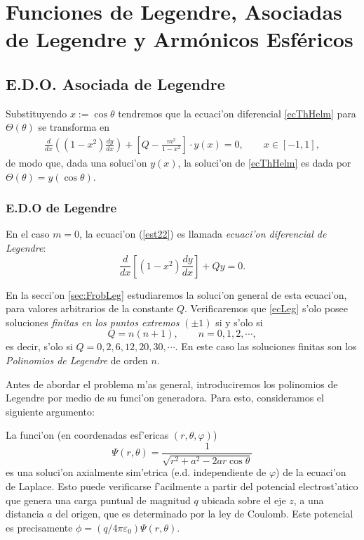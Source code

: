 \chapter{Funciones de Legendre, Asociadas de Legendre y Arm\'onicos Esf\'ericos}

\section{E.D.O. Asociada de Legendre}
Substituyendo $x:=\cos\theta$ tendremos que la ecuaci'on diferencial \eqref{ecThHelm} para $\Theta(\theta)$ se transforma en 
\begin{eqnarray}
\frac{d}{dx}\left((1-x^2)\frac{dy}{dx}\right) +
\left[Q-\frac{m^2}{1-x^2}\right]\cdot y(x) = 0, \qquad x\in [-1,1],\label{est22}
\end{eqnarray}
de modo que, dada una soluci'on $y(x)$, la soluci'on de \eqref{ecThHelm} es dada por $\Theta(\theta)=y(\cos\theta)$. 

\subsection{E.D.O de Legendre}
En el caso $m=0$, la ecuaci'on (\ref{est22}) es llamada \textit{ecuaci'on
diferencial de Legendre}:
\begin{equation}\label{ecLeg}
\frac{d}{dx}\left[\left(1-x^2 \right)\frac{dy}{dx}\right]+Qy=0.
\end{equation}

 En la secci'on \ref{sec:FrobLeg} estudiaremos la soluci'on general de esta ecuaci'on, para valores arbitrarios de la constante $Q$. Verificaremos que \eqref{ecLeg} s'olo posee soluciones \textit{finitas en los puntos extremos} $(\pm 1)$ si y s'olo si
\begin{equation}
Q=n(n+1),\qquad n=0, 1,2, \cdots,
\end{equation} 
es decir, s'olo si $Q=0,2,6,12,20,30,\cdots$. En este caso las soluciones finitas son los \textit{Polinomios de Legendre} de orden $n$.

Antes de abordar el problema m'as general, introduciremos los polinomios de Legendre por medio de su funci'on generadora. Para esto, consideramos el siguiente argumento:

La funci'on (en coordenadas esf'ericas $(r,\theta,\varphi)$)
\begin{equation}\label{PsisolLap}
\Psi(r,\theta)=\frac{1}{\sqrt{r^2+a^2-2ar\cos\theta}}
\end{equation}
es una soluci'on axialmente sim'etrica (e.d. independiente de $\varphi$) de la ecuaci'on de Laplace. Esto puede verificarse f'acilmente a partir del potencial electrost'atico que genera una carga puntual de magnitud $q$ ubicada sobre el eje $z$, a una distancia $a$ del origen, que es determinado por la ley de Coulomb. Este potencial es precisamente $\phi=(q/4\pi\varepsilon_0)\Psi(r,\theta)$.


